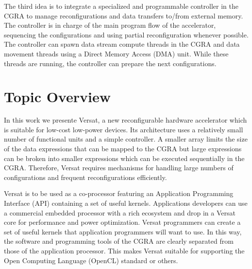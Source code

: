 The third idea is to integrate a specialized and programmable
controller in the CGRA to manage reconfigurations and data transfers
to/from external memory. The controller is in charge of the main
program flow of the accelerator, sequencing the configurations and
using partial reconfiguration whenever possible. The controller can
spawn data stream compute threads in the CGRA and data movement
threads using a Direct Memory Access (DMA) unit. While these threads are
running, the controller can prepare the next configurations.


\begin{comment}

Normally, the reconfigurable array is used only to accelerate program
loops and the non-loop code is run on an attached processor which has
a conventional architecture. For this reason, CGRAs normally include a
conventional processor. For example, the Morphosys
architecture~\cite{Lee00} integrates a small Reduced Instruction Set
Computer (RISC) and the ADRES architecture~\cite{Mei05} integrates a
Very Large Instruction Word (VLIW) processor.

\end{comment}



\section{Topic Overview}
\label{section:overview}

In this work we presente Versat, a new reconfigurable hardware
accelerator which is suitable for low-cost low-power devices. Its
architecture uses a relatively small number of functional units and a
simple controller. A smaller array limits the size of the data
expressions that can be mapped to the CGRA but large expressions can
be broken into smaller expressions which can be executed sequentially
in the CGRA. Therefore, Versat requires mechanisms for handling large
numbers of configurations and frequent reconfigurations efficiently.

Versat is to be used as a co-processor featuring an Application Programming
Interface (API) containing a set of useful kernels. Applications developers
can use a commercial embedded processor with a rich ecosystem and drop in a
Versat core for performance and power optimization. Versat programmers can
create a set of useful kernels that application programmers will want to
use. In this way, the software and programming tools of the CGRA are
clearly separated from those of the application processor. This makes
Versat suitable for supporting the Open Computing Language (OpenCL)
standard or others.

